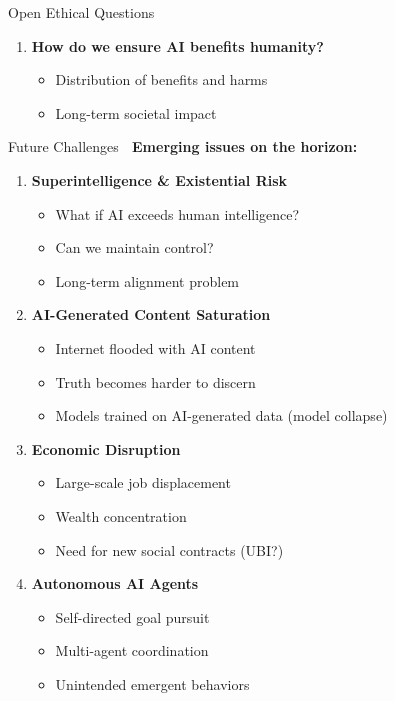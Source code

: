 \documentclass[aspectratio=169]{beamer}
\begin{document}
\begin{frame}[shrink=10]{Open Ethical Questions 🤔}
\begin{enumerate}
    \item \textbf{How do we ensure AI benefits humanity?}
    \begin{itemize}\setlength{\itemsep}{0pt}
        \item Distribution of benefits and harms
        \item Long-term societal impact
    \end{itemize}
\end{enumerate}
\end{frame}

\begin{frame}[shrink=10]{Future Challenges 🔮}
\textbf{Emerging issues on the horizon:}

\vspace{0.5em}

\begin{enumerate}\setlength{\itemsep}{0pt}
    \item \textbf{Superintelligence \& Existential Risk}
    \begin{itemize}\setlength{\itemsep}{0pt}
        \item What if AI exceeds human intelligence?
        \item Can we maintain control?
        \item Long-term alignment problem
    \end{itemize}

    \item \textbf{AI-Generated Content Saturation}
    \begin{itemize}\setlength{\itemsep}{0pt}
        \item Internet flooded with AI content
        \item Truth becomes harder to discern
        \item Models trained on AI-generated data (model collapse)
    \end{itemize}

    \item \textbf{Economic Disruption}
    \begin{itemize}\setlength{\itemsep}{0pt}
        \item Large-scale job displacement
        \item Wealth concentration
        \item Need for new social contracts (UBI?)
    \end{itemize}

    \item \textbf{Autonomous AI Agents}
    \begin{itemize}\setlength{\itemsep}{0pt}
        \item Self-directed goal pursuit
        \item Multi-agent coordination
        \item Unintended emergent behaviors
    \end{itemize}


\end{enumerate}
\end{frame}
\end{document}
